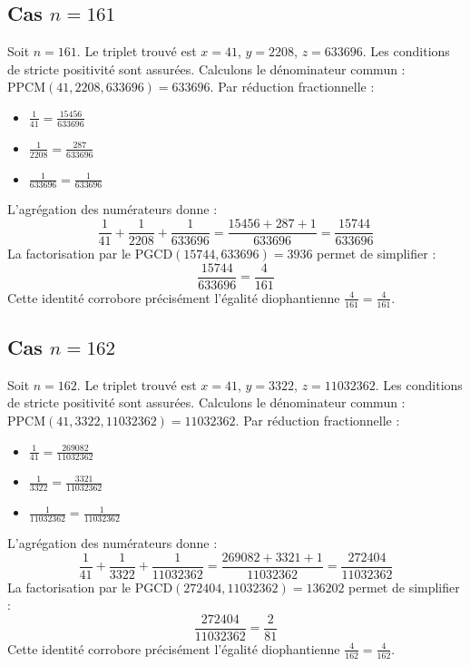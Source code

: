 \documentclass[11pt,a4paper]{article}
\begin{document}
\subsection{Cas $n = 161$}
Soit $n = 161$. Le triplet trouvé est $x = 41$, $y = 2208$, $z = 633696$.
Les conditions de stricte positivité sont assurées.
Calculons le dénominateur commun : $\text{PPCM}(41, 2208, 633696) = 633696$.
Par réduction fractionnelle :
\begin{itemize}
    \item $\frac{1}{41} = \frac{15456}{633696}$
    \item $\frac{1}{2208} = \frac{287}{633696}$
    \item $\frac{1}{633696} = \frac{1}{633696}$
\end{itemize}
L'agrégation des numérateurs donne :
$$ \frac{1}{41} + \frac{1}{2208} + \frac{1}{633696} = \frac{15456 + 287 + 1}{633696} = \frac{15744}{633696} $$
La factorisation par le $\text{PGCD}(15744, 633696) = 3936$ permet de simplifier :
$$ \frac{15744}{633696} = \frac{4}{161} $$
Cette identité corrobore précisément l'égalité diophantienne $\frac{4}{161} = \frac{4}{161}$.

\subsection{Cas $n = 162$}
Soit $n = 162$. Le triplet trouvé est $x = 41$, $y = 3322$, $z = 11032362$.
Les conditions de stricte positivité sont assurées.
Calculons le dénominateur commun : $\text{PPCM}(41, 3322, 11032362) = 11032362$.
Par réduction fractionnelle :
\begin{itemize}
    \item $\frac{1}{41} = \frac{269082}{11032362}$
    \item $\frac{1}{3322} = \frac{3321}{11032362}$
    \item $\frac{1}{11032362} = \frac{1}{11032362}$
\end{itemize}
L'agrégation des numérateurs donne :
$$ \frac{1}{41} + \frac{1}{3322} + \frac{1}{11032362} = \frac{269082 + 3321 + 1}{11032362} = \frac{272404}{11032362} $$
La factorisation par le $\text{PGCD}(272404, 11032362) = 136202$ permet de simplifier :
$$ \frac{272404}{11032362} = \frac{2}{81} $$
Cette identité corrobore précisément l'égalité diophantienne $\frac{4}{162} = \frac{4}{162}$.
\end{document}
